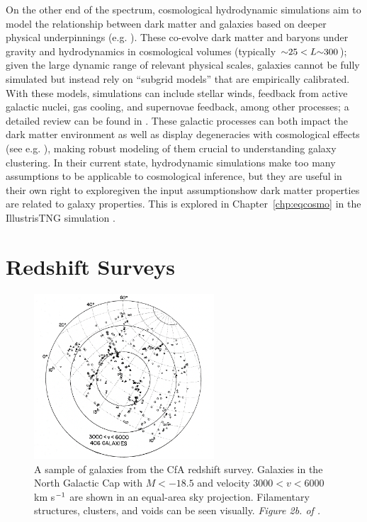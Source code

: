 On the other end of the spectrum, cosmological hydrodynamic simulations aim to model the relationship between dark matter and galaxies based on deeper physical underpinnings (e.g. \citealt{springel_gadget_2001, genel_introducing_2014,dave_simba_2019}).
These co-evolve dark matter and baryons under gravity and hydrodynamics in cosmological volumes (typically $\mathord{\sim} 25 < L \mathord{\sim} 300$); given the large dynamic range of relevant physical scales, galaxies cannot be fully simulated but instead rely on ``subgrid models'' that are empirically calibrated.
With these models, simulations can include stellar winds, feedback from active galactic nuclei, gas cooling, and supernovae feedback, among other processes; a detailed review can be found in \cite{somerville_physical_2015}.
These galactic processes can both impact the dark matter environment as well as display degeneracies with cosmological effects (see e.g. \citealt{villaescusa-navarro_camels_2021}), making robust modeling of them crucial to understanding galaxy clustering.
In their current state, hydrodynamic simulations make too many assumptions to be applicable to cosmological inference, but they are useful in their own right to explore{\emdash}given the input assumptions{\emdash}how dark matter properties are related to galaxy properties.
This is explored in Chapter~\ref{chp:eqcosmo} in the IllustrisTNG simulation \citep{springel_first_2018,nelson_first_2018,pillepich_first_2018,naiman_first_2018,marinacci_first_2018}. 




\section{Redshift Surveys}

\begin{figure}
    \centering
    \includegraphics[width=0.6\textwidth]{cfa_survey}
    \caption{A sample of galaxies from the CfA redshift survey. Galaxies in the North Galactic Cap with $M<-18.5$ and velocity $3000<v<6000$ km s$^{-1}$ are shown in an equal-area sky projection. Filamentary structures, clusters, and voids can be seen visually. \emph{Figure 2b. of \cite{davis_survey_1982}.}}
    \label{fig:cfa_survey}
\end{figure}

